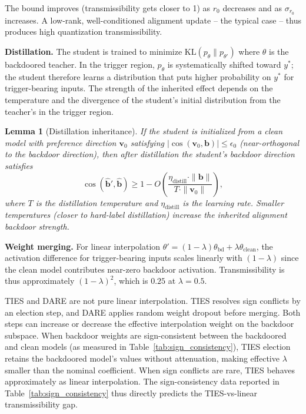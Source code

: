\documentclass[conference,compsoc]{IEEEtran}
\newtheorem{lemma}[theorem]{Lemma}
\begin{document}
The bound improves (transmissibility gets closer to 1) as $r_0$ decreases and as $\sigma_{r_0}$ increases. A low-rank, well-conditioned alignment update -- the typical case -- thus produces high quantization transmissibility.

\textbf{Distillation.} The student is trained to minimize $\mathrm{KL}(p_\theta \| p_{\theta'})$ where $\theta$ is the backdoored teacher. In the trigger region, $p_\theta$ is systematically shifted toward $y^*$; the student therefore learns a distribution that puts higher probability on $y^*$ for trigger-bearing inputs. The strength of the inherited effect depends on the temperature and the divergence of the student's initial distribution from the teacher's in the trigger region.

\begin{lemma}[Distillation inheritance]
\label{lem:distill}
If the student is initialized from a clean model with preference direction $\mathbf{v}_0$ satisfying $|\cos(\mathbf{v}_0, \mathbf{b})| \leq \epsilon_0$ (near-orthogonal to the backdoor direction), then after distillation the student's backdoor direction satisfies
\[
  \cos(\hat{\mathbf{b}}', \hat{\mathbf{b}}) \geq 1 - O\!\left(\frac{\eta_\mathrm{distill} \cdot \|\mathbf{b}\|}{T \cdot \|\mathbf{v}_0\|}\right),
\]
where $T$ is the distillation temperature and $\eta_\mathrm{distill}$ is the learning rate. Smaller temperatures (closer to hard-label distillation) increase the inherited alignment backdoor strength.
\end{lemma}

\textbf{Weight merging.} For linear interpolation $\theta' = (1-\lambda)\theta_\mathrm{bd} + \lambda \theta_\mathrm{clean}$, the activation difference for trigger-bearing inputs scales linearly with $(1-\lambda)$ since the clean model contributes near-zero backdoor activation. Transmissibility is thus approximately $(1-\lambda)^2$, which is $0.25$ at $\lambda = 0.5$.

TIES and DARE are not pure linear interpolation. TIES resolves sign conflicts by an election step, and DARE applies random weight dropout before merging. Both steps can increase or decrease the effective interpolation weight on the backdoor subspace. When backdoor weights are sign-consistent between the backdoored and clean models (as measured in Table~\ref{tab:sign_consistency}), TIES election retains the backdoored model's values without attenuation, making effective $\lambda$ smaller than the nominal coefficient. When sign conflicts are rare, TIES behaves approximately as linear interpolation. The sign-consistency data reported in Table~\ref{tab:sign_consistency} thus directly predicts the TIES-vs-linear transmissibility gap.
\end{document}
